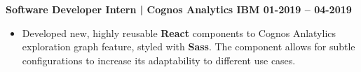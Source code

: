 \textbf{Software Developer Intern | Cognos Analytics \hspace{-10mm} \hfill IBM \hfill 01-2019 -- 04-2019}\par

\begin{itemize}
        \item Developed new, highly reusable \textbf{React} components to Cognos Anlatylics exploration graph feature, styled with \textbf{Sass}. The component allows for subtle configurations to increase its adaptability to different use cases.
\end{itemize}\par